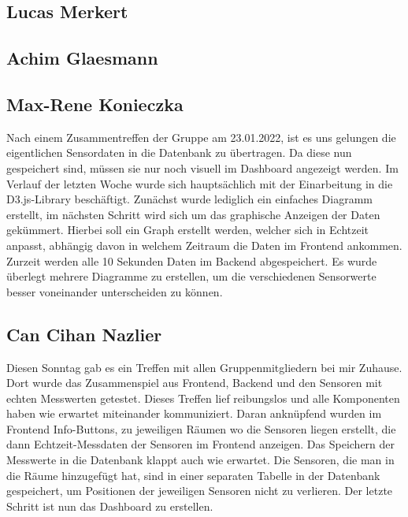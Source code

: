 \documentclass[]{article}
\begin{document}
\subsection{Lucas Merkert}



\subsection{Achim Glaesmann}


\subsection{Max-Rene Konieczka}
Nach einem Zusammentreffen der Gruppe am 23.01.2022, ist es uns gelungen die eigentlichen Sensordaten in die Datenbank zu übertragen. Da diese nun gespeichert sind, müssen sie nur noch visuell im Dashboard angezeigt werden. Im Verlauf der letzten Woche wurde sich hauptsächlich mit der Einarbeitung in die D3.js-Library beschäftigt. Zunächst wurde lediglich ein einfaches Diagramm erstellt, im nächsten Schritt wird sich um das graphische Anzeigen der Daten gekümmert. Hierbei soll ein Graph erstellt werden, welcher sich in Echtzeit anpasst, abhängig davon in welchem Zeitraum die Daten im Frontend ankommen. Zurzeit werden alle 10 Sekunden Daten im Backend abgespeichert. Es wurde überlegt mehrere Diagramme zu erstellen, um die verschiedenen Sensorwerte besser voneinander unterscheiden zu können.  

\subsection{Can Cihan Nazlier}
Diesen Sonntag gab es ein Treffen mit allen Gruppenmitgliedern bei mir Zuhause. Dort wurde das Zusammenspiel aus Frontend, Backend und den Sensoren mit echten Messwerten getestet. Dieses Treffen lief reibungslos und alle Komponenten haben wie erwartet miteinander kommuniziert. Daran anknüpfend wurden im Frontend Info-Buttons, zu jeweiligen Räumen wo die Sensoren liegen erstellt, die dann Echtzeit-Messdaten der Sensoren im Frontend anzeigen. Das Speichern der Messwerte in die Datenbank klappt auch wie erwartet.
Die Sensoren, die man in die Räume hinzugefügt hat, sind in einer separaten Tabelle in der Datenbank gespeichert, um Positionen der jeweiligen Sensoren nicht zu verlieren.
Der letzte Schritt ist nun das Dashboard zu erstellen.

\printbibliography
\end{document}
